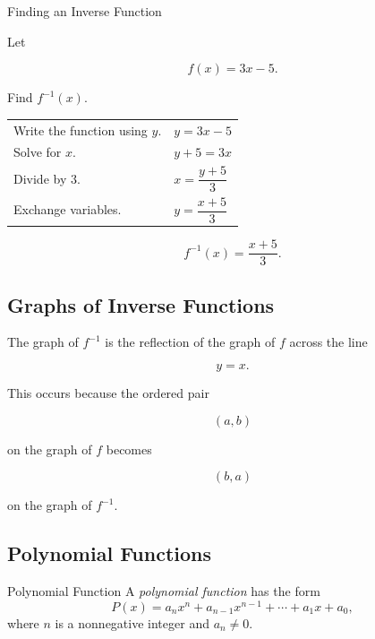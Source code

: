 \begin{workedexamplebox}{Finding an Inverse Function}

Let

\[ f(x)=3x-5. \]

Find \(f^{-1}(x)\).

\begin{tabularx}{\textwidth}{@{}>{\raggedright\arraybackslash}p{}X@{}}
Write the function using \(y\). &
\(y=3x-5\)\\
Solve for \(x\). &
\(y+5=3x\)\\
Divide by \(3\). &
\(x=\dfrac{y+5}{3}\)\\
Exchange variables. &
\(y=\dfrac{x+5}{3}\)
\end{tabularx}

\begin{answerbox}
\[ \boxed{f^{-1}(x)=\frac{x+5}{3}.} \]
\end{answerbox}
\end{workedexamplebox}

\subsection{Graphs of Inverse Functions}
\label{subsec:inverse-function-graphs}

The graph of \(f^{-1}\) is the reflection of the graph of \(f\) across the
line

\[ y=x. \]

This occurs because the ordered pair

\[ (a,b) \]

on the graph of \(f\) becomes

\[ (b,a) \]

on the graph of \(f^{-1}\).

\subsection{Polynomial Functions}
\label{subsec:polynomial-functions-analysis}

\begin{definitionbox}{Polynomial Function}
A \emph{polynomial function} has the form
\[ P(x)=a_nx^n+a_{n-1}x^{n-1}+\cdots+a_1x+a_0, \]
where \(n\) is a nonnegative integer and \(a_n\neq0\).
\end{definitionbox}

